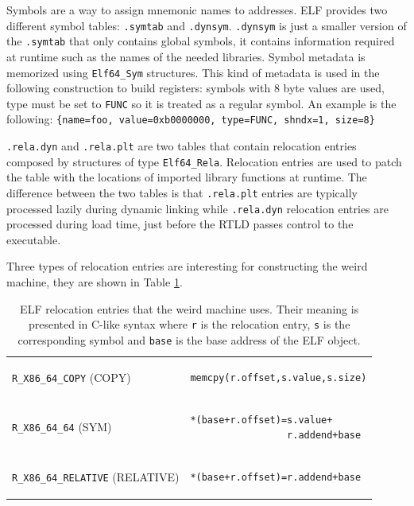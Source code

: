 \documentclass[11pt,twoside,a4paper]{article}
\begin{document}
Symbols are a way to assign mnemonic names to addresses. ELF provides two different symbol tables: \texttt{.symtab} and \texttt{.dynsym}. \texttt{.dynsym} is just a smaller version of the \texttt{.symtab} that only contains global symbols, it contains information required at runtime such as the names of the needed libraries. Symbol metadata is memorized using \texttt{Elf64\_Sym} structures. This kind of metadata is used in the following construction to build registers: symbols with 8 byte values are used, type must be set to \texttt{FUNC} so it is treated as a regular symbol. An example is the following:
\texttt{\{name=foo, value=0xb0000000, type=FUNC, shndx=1, size=8\}}

\texttt{.rela.dyn} and \texttt{.rela.plt} are two tables that contain relocation entries composed by structures of type \texttt{Elf64\_Rela}. Relocation entries are used to patch the table with the locations of imported library functions at runtime. The difference between the two tables is that \texttt{.rela.plt} entries are typically processed lazily during dynamic linking while \texttt{.rela.dyn} relocation entries are processed during load time, just before the RTLD passes control to the executable.

Three types of relocation entries are interesting for constructing the weird machine, they are shown in Table \ref{r_entries}.

\begin{table}
\centering
\begin{tabular}{ l | l }
  \hline
  \texttt{R\_X86\_64\_COPY} (COPY)
  &
\begin{lstlisting}
memcpy(r.offset,s.value,s.size)
\end{lstlisting} \\
  \texttt{R\_X86\_64\_64} (SYM) &
\begin{lstlisting}
*(base+r.offset)=s.value+
                 r.addend+base
\end{lstlisting} \\
  \texttt{R\_X86\_64\_RELATIVE} (RELATIVE) &
\begin{lstlisting}
*(base+r.offset)=r.addend+base
\end{lstlisting} \\
  \hline
\end{tabular}
  \captionsetup{width=13.5cm}
  \caption{ELF relocation entries that the weird machine uses. Their meaning is presented in C-like syntax where \texttt{r} is the relocation entry, \texttt{s} is the corresponding symbol and \texttt{base} is the base address of the ELF object.}
  \label{r_entries}
\end{table}
\end{document}
